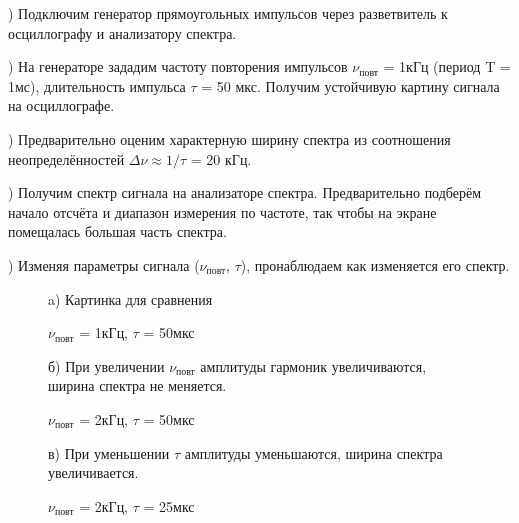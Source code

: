\documentclass[a4paper,12pt]{article}
\begin{document}
) Подключим генератор прямоугольных импульсов через разветвитель к осциллографу и анализатору спектра.

) На генераторе зададим частоту повторения импульсов $\nu_{\text{повт}}$ = 1кГц (период T = 1мс), длительность импульса $\tau$ = 50 мкс. Получим устойчивую картину сигнала на осциллографе. 

) Предварительно оценим характерную ширину спектра из соотношения неопределённостей $\Delta\nu \approx 1/\tau$ = 20 кГц. 

) Получим спектр сигнала на анализаторе спектра. Предварительно подберём начало отсчёта и диапазон измерения по частоте, так чтобы на экране помещалась большая часть спектра.

) Изменяя параметры сигнала ($\nu_{\text{повт}}$, $\tau$), пронаблюдаем как изменяется его спектр.

\begin{figure}[h]
\caption{$\nu_{\text{повт}}$ = 1кГц, $\tau$ = 50мкс}
a) Картинка для сравнения
\end{figure}

\begin{figure}[h]
\caption{$\nu_{\text{повт}}$ = 2кГц, $\tau$ = 50мкс}
б) При увеличении $\nu_{\text{повт}}$ амплитуды гармоник увеличиваются, ширина спектра не меняется.
\end{figure}

\begin{figure}[h]
\caption{$\nu_{\text{повт}}$ = 2кГц, $\tau$ = 25мкс}
в) При уменьшении $\tau$ амплитуды уменьшаются, ширина спектра увеличивается.
\end{figure}
\end{document}
